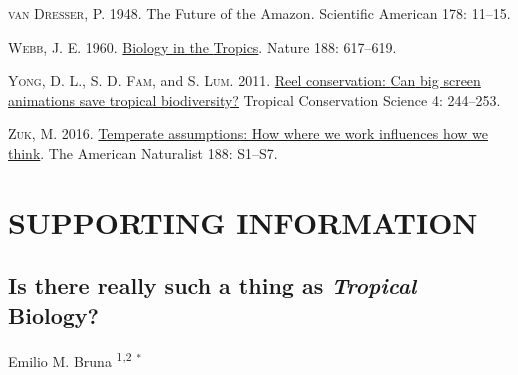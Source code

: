 \documentclass[
  12pt,
  man, donotrepeattitle,floatsintext]{apa6}
\newlength{\cslhangindent}
\newlength{\cslentryspacingunit} %
\newenvironment{CSLReferences}[2] %
 {%
  \setlength{\parindent}{0pt}
  \ifodd #1
  \let\oldpar\par
  \def\par{\hangindent=\cslhangindent\oldpar}
  \fi
  \setlength{\parskip}{#2\cslentryspacingunit}
 }%
 {}
\begin{document}
\begin{CSLReferences}{1}{0}
\leavevmode{}%
\textsc{van Dresser, P.} 1948. The {Future} of the {Amazon}. Scientific American 178: 11--15.

\leavevmode{}%
\textsc{Webb, J. E.} 1960. \href{https://doi.org/10.1038/188617a0}{Biology in the {Tropics}}. Nature 188: 617--619.

\leavevmode{}%
\textsc{Yong, D. L.}, \textsc{S. D. Fam}, and \textsc{S. Lum}. 2011. \href{https://doi.org/10.1177/194008291100400302}{Reel conservation: {Can} big screen animations save tropical biodiversity?} Tropical Conservation Science 4: 244--253.

\leavevmode{}%
\textsc{Zuk, M.} 2016. \href{https://doi.org/10.1086/687546}{Temperate assumptions: How where we work influences how we think}. The American Naturalist 188: S1--S7.

\end{CSLReferences}

\newpage

\renewcommand{\appendixname}{Supporting Information}
\renewcommand{\thefigure}{S\arabic{figure}} \setcounter{figure}{0}
\renewcommand{\thetable}{S\arabic{table}} \setcounter{table}{0}
\renewcommand{\theequation}{S\arabic{table}} \setcounter{equation}{0}
\setcounter{page}{1}

\nolinenumbers

\hypertarget{supporting-information}{%
\section{SUPPORTING INFORMATION}\label{supporting-information}}

\bigskip
\bigskip

\hypertarget{is-there-really-such-a-thing-as-tropical-biology}{%
\subsection{\texorpdfstring{Is there really such a thing as \emph{Tropical} Biology?}{Is there really such a thing as Tropical Biology?}}\label{is-there-really-such-a-thing-as-tropical-biology}}

\bigskip
\bigskip
\bigskip
\bigskip

\noindent Emilio M. Bruna \textsuperscript{1,2} \(^\ast\)

\bigskip
\bigskip
\end{document}
